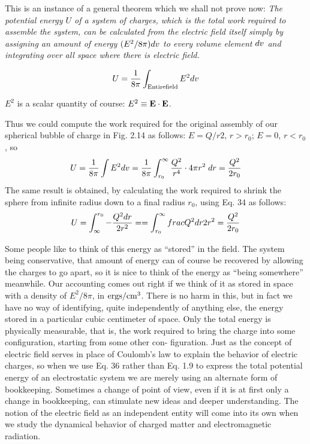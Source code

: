 This is an instance of a general theorem which we shall not prove
now: \emph{The potential energy $U$ of a system of charges, which is the total
work required to assemble the system, can be calculated from the electric
field itself simply by assigning an amount of energy $(E^2/8\pi)d v$ to
every volume element $d v$ and integrating over all space where there
is electric field.}
\begin{framed}
\begin{equation}
U = \frac{1}{8\pi}\int_{\text{Entire\\field}} E^2d v
\end{equation}
\end{framed}
\noindent $E^2$ is a scalar quantity of course: $E^2\equiv\mathbf{E}\cdot\mathbf{E}$.

Thus we could compute the work required for the original assembly
of our spherical bubble of charge in Fig. 2.14 as follows: $E = Q/r2$,
$r>r_0$; $E =0$, $r<r_0$, so
\begin{equation}
  U = \frac{1}{8\pi}\int E^2d v = \frac{1}{8\pi}\int_{r_0}^\infty \frac{Q^2}{r^4}\cdot 4\pi r^2\;d r
       = \frac{Q^2}{2r_0}
\end{equation}
The same result is obtained, by calculating the work required to
shrink the sphere from infinite radius down to a final radius $r_0$, using
Eq. 34 as follows:
\begin{equation}
  U = \int_{\infty}^{r_0}-\frac{Q^2d r}{2 r^2} = 
    = \int_{r_0}^\infty \\frac{Q^2d r}{2 r^2}
    = \frac{Q^2}{2r_0}
\end{equation}


Some people like to think of this energy as ``stored'' in the field.
The system being conservative, that amount of energy can of course
be recovered by allowing the charges to go apart, so it is nice to think
of the energy as ``being somewhere'' meanwhile. Our accounting
comes out right if we think of it as stored in space with a density of
$E^2/8\pi$, in $\textup{ergs}/\textup{cm}^3$. There is no harm in this, but in fact we have no
way of identifying, quite independently of anything else, the energy
stored in a particular cubic centimeter of space. Only the total
energy is physically measurable, that is, the work required to bring
the charge into some configuration, starting from some other con-
figuration. Just as the concept of electric field serves in place of
Coulomb's law to explain the behavior of electric charges, so when
we use Eq. 36 rather than Eq. 1.9 to express the total potential energy
of an electrostatic system we are merely using an alternate form of
bookkeeping. Sometimes a change of point of view, even if it is at
first only a change in bookkeeping, can stimulate new ideas and
deeper understanding. The notion of the electric field as an independent
entity will come into its own when we study the dynamical
behavior of charged matter and electromagnetic radiation.

